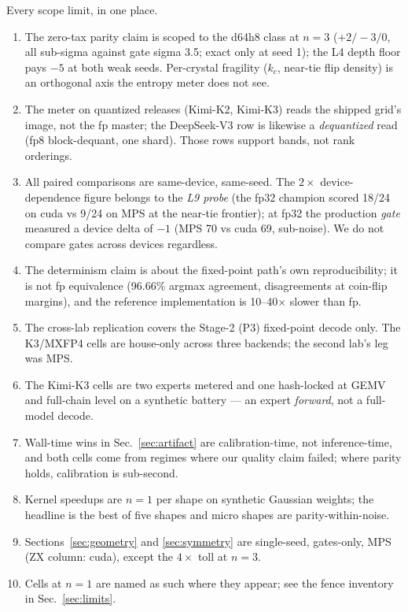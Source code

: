 \documentclass[11pt]{article}
\begin{document}
Every scope limit, in one place.
\begin{enumerate}
\item The zero-tax parity claim is scoped to the d64h8 class at $n{=}3$
($+2/-3/0$, all sub-sigma against gate sigma 3.5; exact only at seed 1); the L4
depth floor pays $-5$ at both weak seeds. %
Per-crystal fragility ($k_c$, near-tie flip density) is an orthogonal axis the
entropy meter does not see. %
\item The meter on quantized releases (Kimi-K2, Kimi-K3) reads the shipped grid's
image, not the fp master; the DeepSeek-V3 row is likewise a \emph{dequantized}
read (fp8 block-dequant, one shard). %
Those rows support bands, not rank orderings.
\item All paired comparisons are same-device, same-seed. The $2\times$
device-dependence figure belongs to the \emph{L9 probe} (the fp32 champion scored
18/24 on cuda vs 9/24 on MPS at the near-tie frontier); %
at fp32 the production \emph{gate} measured a device delta of $-1$ (MPS 70 vs
cuda 69, sub-noise). %
We do not compare gates across devices regardless.
\item The determinism claim is about the fixed-point path's own reproducibility;
it is not fp equivalence (96.66\% argmax agreement, disagreements at coin-flip
margins), and the reference implementation is 10--40$\times$ slower than fp.
\item The cross-lab replication covers the Stage-2 (P3) fixed-point decode only.
The K3/MXFP4 cells are house-only across three backends; the second lab's leg was
MPS. %
\item The Kimi-K3 cells are two experts metered and one hash-locked at GEMV and
full-chain level on a synthetic battery --- an expert \emph{forward}, not a
full-model decode. %
\item Wall-time wins in Sec.~\ref{sec:artifact} are calibration-time, not
inference-time, and both cells come from regimes where our quality claim failed;
where parity holds, calibration is sub-second. %
\item Kernel speedups are $n{=}1$ per shape on synthetic Gaussian weights; the
headline is the best of five shapes and micro shapes are parity-within-noise.
\item Sections~\ref{sec:geometry} and \ref{sec:symmetry} are single-seed,
gates-only, MPS (ZX column: cuda), except the $4\times$ toll at $n{=}3$.
\item Cells at $n{=}1$ are named as such where they appear; see the fence
inventory in Sec.~\ref{sec:limits}.
\end{enumerate}
\end{document}
